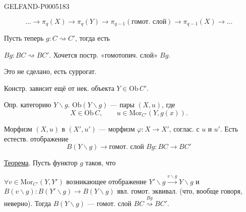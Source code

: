 \begin{GelfandAdjacentEvidence}{GELFAND-P000518}{3}

\[
\ldots\to\pi_q(X)\to\pi_q(Y)\to
\pi_{q-1}(\text{гомот. слой})\to\pi_{q-1}(X)\to\ldots
\]

Пусть теперь \underline{$g:C\rightsquigarrow C'$}, тогда есть

$Bg:BC\rightsquigarrow BC'$. Хочется постр. «гомотопич. слой» $Bg$.

Это не сделано, есть суррогат.

Констр. зависит ещё от нек. объекта $Y\in\mathrm{Ob}\,C'$.

Опр. категорию $Y\backslash g$. $\mathrm{Ob}(Y\backslash g)$ — пары $(X,u)$, где
\[
X\in\mathrm{Ob}\,C,\qquad u\in\mathrm{Mor}_{C'}(Y,g(x)).
\]

Морфизм $(X,u)$ в $(X',u')$ — морфизм $\varphi:X\to X'$,
соглас. с $u$ и $u'$. Есть естеств. отображение
\[
B(Y\backslash g)\to\text{гомот. слой }Bg:BC\to BC'
\]
\end{GelfandAdjacentEvidence}


\uline{Теорема}. Пусть функтор $g$ таков, что

$\forall v\in\mathrm{Mor}_{C'}(Y,Y')$ возникающее отображение
$Y'\backslash g\overset{v\backslash g}{\longrightarrow}Y\backslash g$
и $B(v\backslash g):B(Y'\backslash g)\to B(Y\backslash g)$ явл. гомот. эквивал.
(что, вообще говоря, неверно). Тогда $B(Y\backslash g)$ — гомот. слой
$BC\overset{Bg}{\rightsquigarrow}BC'$.


